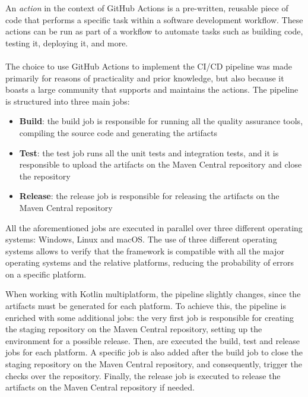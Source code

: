 An \emph{action} in the context of GitHub Actions is a pre-written, reusable piece of code that performs a specific task within a software development
workflow. These actions can be run as part of a workflow to automate tasks such as building code, testing it, deploying it, and more.

\paragraph*{}

The choice to use GitHub Actions to implement the CI/CD pipeline was made primarily for reasons of practicality and prior knowledge, but also because
it boasts a large community that supports and maintains the actions.
The pipeline is structured into three main jobs:

\begin{itemize}
	\item \textbf{Build}: the build job is responsible for running all the quality assurance tools, compiling the source code and generating the
	      artifacts
	\item \textbf{Test}: the test job runs all the unit tests and integration tests, and it is responsible to upload the artifacts on the
	      Maven Central repository and close the repository
	\item \textbf{Release}: the release job is responsible for releasing the artifacts on the Maven Central repository
\end{itemize}

All the aforementioned jobs are executed in parallel over three different operating systems: Windows, Linux and macOS.
The use of three different operating systems allows to verify that the framework is compatible with all the major operating systems and the relative
platforms, reducing the probability of errors on a specific platform.

When working with Kotlin multiplatform, the pipeline slightly changes, since the artifacts must be generated for each platform.
To achieve this, the pipeline is enriched with some additional jobs: the very first job is responsible for creating the staging repository on the
Maven Central repository, setting up the environment for a possible release. Then, are executed the build, test and release jobs for each platform.
A specific job is also added after the build job to close the staging repository on the Maven Central repository, and consequently, trigger the
checks over the repository. Finally, the release job is executed to release the artifacts on the Maven Central repository if needed.

